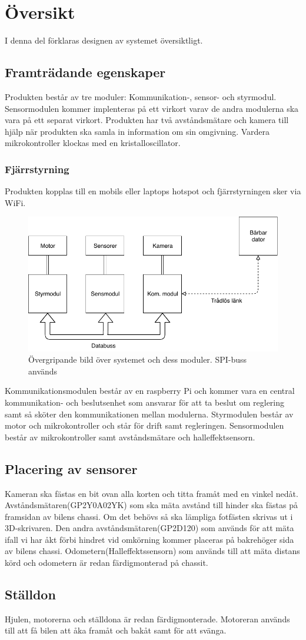 \documentclass[designspec/spec.tex]{subfiles}
\begin{document}
\section{Översikt}
I denna del förklaras designen av systemet översiktligt.

\subsection{Framträdande egenskaper}
Produkten består av tre moduler: Kommunikation-, sensor- och styrmodul.
Sensormodulen kommer implenteras på ett virkort varav de andra modulerna ska
vara på ett separat virkort. Produkten har två avståndsmätare och kamera till
hjälp när produkten ska samla in information om sin omgivning. Vardera
mikrokontroller klockas med en kristalloscillator.

\subsubsection{Fjärrstyrning}
Produkten kopplas till en mobils eller laptops hotspot och fjärrstyrningen sker
via WiFi.

\begin{figure}[h]
    \centering
    \includegraphics[width=0.6\linewidth]{designspec/fig/blockskiss.pdf}
    \caption{Övergripande bild över systemet och dess moduler. SPI-buss används}
    \label{fig:overview}
\end{figure}

Kommunikationsmodulen består av en raspberry Pi och kommer vara en central
kommunikation- och beslutsenhet som ansvarar för att ta beslut om reglering samt
så sköter den kommunikationen mellan modulerna. Styrmodulen består av motor och
mikrokontroller och står för drift samt regleringen. Sensormodulen består av
mikrokontroller samt avståndsmätare och halleffektsensorn.

\subsection{Placering av sensorer}
Kameran ska fästas en bit ovan alla korten och titta framåt med en vinkel nedåt.
Avståndsmätaren(GP2Y0A02YK) som ska mäta avstånd till hinder ska fästas på
framsidan av bilens chassi. Om det behövs så ska lämpliga fotfästen skrivas ut i
3D-skrivaren. Den andra avståndsmätaren(GP2D120) som används för att mäta ifall
vi har åkt förbi hindret vid omkörning kommer placeras på bakrehöger sida av
bilens chassi. Odometern(Halleffektssensorn) som används till att mäta distans
körd och odometern är redan färdigmonterad på chassit.


\subsection{Ställdon}
Hjulen, motorerna och ställdona är redan färdigmonterade. Motoreran används till
att få bilen att åka framåt och bakåt samt för att svänga.
\end{document}
